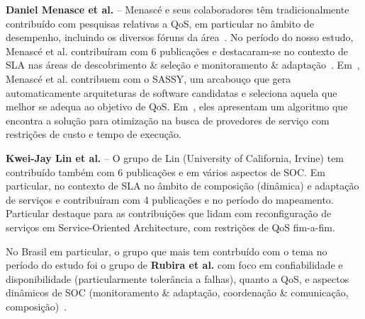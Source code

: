 \textbf{Daniel Menasce et al.} -- Menasc\'{e} e seus colaboradores t\^{e}m tradicionalmente contribu\'{i}do com pesquisas relativas a QoS, em particular no \^{a}mbito de desempenho, incluindo os diversos f\'{o}runs da \'{a}rea~\cite{DBLP:journals/tse/MenasceG00, Menasce:2001:CPW:560806}. No per\'{i}odo do nosso estudo, Menasc\'{e} et al. contribu\'{i}ram com 6 publica\c{c}\~{o}es e destacaram-se no contexto de SLA nas \'{a}reas de descobrimento \& sele\c{c}\~{a}o e monitoramento \& adapta\c{c}\~{a}o~\cite{5696721, DBLP:MenasceCD10, 5552741}. Em~\cite{5696721}, Menasc\'{e} et al. contribuem com o SASSY, um arcabou\c{c}o que gera automaticamente arquiteturas de software candidatas e seleciona aquela que melhor se adequa ao objetivo de QoS. Em~\cite{DBLP:MenasceCD10}, eles apresentam um algoritmo que encontra a solu\c{c}\~{a}o para otimiza\c{c}\~{a}o na busca de provedores de servi\c{c}o com restri\c{c}\~{o}es de custo e tempo de execu\c{c}\~{a}o. 

\textbf{Kwei-Jay Lin et al.} -- O grupo de Lin (University of California, Irvine) tem contribu\'{i}do tamb\'{e}m com 6 publica\c{c}\~{o}es e em v\'{a}rios aspectos de SOC. Em particular, no contexto de SLA no \^{a}mbito de composi\c{c}\~{a}o (din\^{a}mica) e adapta\c{c}\~{a}o de servi\c{c}os e contribu\'{i}ram com 4 publica\c{c}\~{o}es e no per\'{i}odo do mapeamento. Particular destaque para  as contribui\c{c}\~{o}es \cite{Lin:2009:EAS:1602932.1603224, Lin:2010:DIS:1861294.1861332, Zhai:2009:SMS:1586636.1586972} que lidam com reconfigura\c{c}\~{a}o de servi\c{c}os em Service-Oriented Architecture, com restri\c{c}\~{o}es de QoS fim-a-fim. 

No Brasil em particular, o grupo que mais tem contrbu\'{i}do com o tema no per\'{i}odo do estudo foi o grupo de \textbf{Rubira et al.} com foco em confiabilidade e disponibilidade (particularmente tolerância a falhas), quanto a QoS, e aspectos dinâmicos de SOC (monitoramento \& adaptação, coordenação \& comunicação, composição)~\cite{5457748, Nascimento:2011:SAA:2019136.2019153,5783387}.


